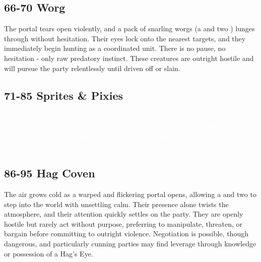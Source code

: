 \subsection*{66-70 Worg}
{\entryfont The portal tears open violently, and a pack of snarling worgs (a \hyperref[monster:DireWorg]{} and two \hyperref[monster:Worg]{}) lunges through without hesitation. Their eyes lock onto the nearest targets, and they immediately begin hunting as a coordinated unit. There is no pause, no hesitation - only raw predatory instinct. These creatures are outright hostile and will pursue the party relentlessly until driven off or slain.}
\vspace*{-0.1em}\subsection*{71-85 Sprites \& Pixies}
{\entryfont\textcolor{white}{\textbf{A burst of glittering light scatters into dozens of tiny winged figures as sprites and pixies emerge from the portal. The moment they notice the party, panic spreads among them. Without hesitation, they scatter in all directions, darting through the air and vanishing into foliage.}}}
\subsection*{86-95 Hag Coven}
{\entryfont The air grows cold as a warped and flickering portal opens, allowing a \hyperref[monster:BheurHag]{} and two \hyperref[monster:AnnisHag]{} to step into the world with unsettling calm. Their presence alone twists the atmosphere, and their attention quickly settles on the party. They are openly hostile but rarely act without purpose, preferring to manipulate, threaten, or bargain before committing to outright violence. Negotiation is possible, though dangerous, and particularly cunning parties may find leverage through knowledge or possession of a Hag's Eye.}
